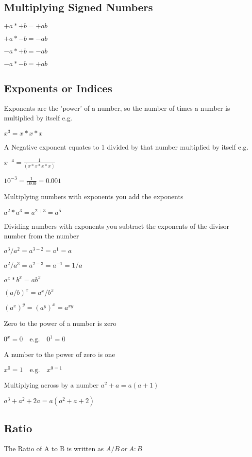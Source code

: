 \documentclass{article}
\begin{document}
\subsection{Multiplying Signed Numbers}

$+a * +b = +ab$

$+a * -b = -ab$

$-a * +b = -ab$

$-a * -b = +ab$

\subsection{Exponents or Indices}
Exponents are the 'power' of a number, so the number of times a number is multiplied by itself e.g.

$x^{3} = x * x * x$

A Negative exponent equates to 1 divided by that number multiplied by itself e.g.

$x^{-4} = \frac{1}{(x * x * x * x)}$

$ 10^{-3}  = \frac{1}{1000} = 0.001 $


Multiplying numbers with exponents you add the exponents 

$a^{2} * a^{3} = a^{2+3} = a^{5}$

Dividing numbers with exponents you subtract the exponents of the divisor number from the number 

$a^{3} / a^{2} = a^{3-2} = a^{1} = a$

$a^{2} / a^{3} = a^{2-3} = a^{-1} = 1/a$

$ a^{x} * b^{x} = ab^{x}$

$ (a/b)^{x} = a^{x} / b^{x} $

$ (a^{x})^{y} =  (a^{y})^{x}  = a^{xy}$


Zero to the power of a number is zero

$ 0^{x} = 0 \quad \textrm{e.g.} \quad  0^{1} = 0$

A number to the power of zero is one

$ x^{0} = 1 \quad \textrm{e.g.} \quad  x^{0 =1}$

Multiplying across by a number 
$a^{2} + a = a (a + 1) $

$a^{3} + a^{2} + 2a = a (a^{2} + a  + 2 )$

\subsection{Ratio}
The Ratio of A to B is written as $ A/B \ or \ A : B$
\end{document}

